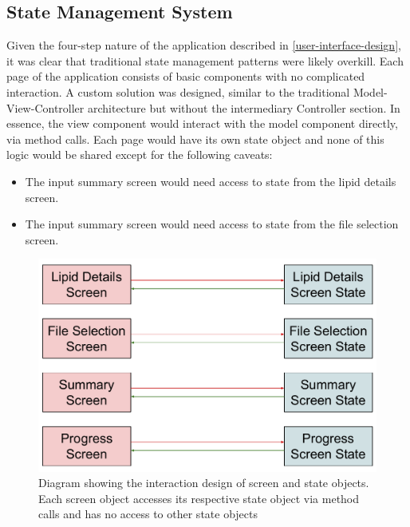 \documentclass{l4proj}
\begin{document}
\subsection{State Management System} \label{state-management-design}
Given the four-step nature of the application described in \ref{user-interface-design}, it was clear that traditional state management patterns were likely overkill. Each page of the application consists of basic components with no complicated interaction. A custom solution was designed, similar to the traditional Model-View-Controller architecture but without the intermediary Controller section. In essence, the view component would interact with the model component directly, via method calls. Each page would have its own state object and none of this logic would be shared except for the following caveats:
\begin{itemize}
    \item The input summary screen would need access to state from the lipid details screen.
    \item The input summary screen would need access to state from the file selection screen.
\end{itemize}

\begin{figure}
    \centering
    \includegraphics[scale=0.5]{dissertation/images/wireframes/gui-state-diagram.pdf}
    \caption{Diagram showing the interaction design of screen and state objects. Each screen object accesses its respective state object via method calls and has no access to other state objects}
    \label{fig:gui-state-interaction}
\end{figure}

\end{document}
